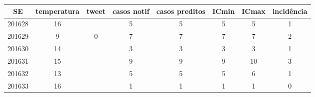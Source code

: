 \begin{tabular}{c|ccccccc}
  \hline
SE & temperatura & tweet & casos notif & casos preditos & ICmin & ICmax & incidência \\ 
  \hline
201628 & 16 &  & 5 & 5 & 5 & 5 & 1 \\ 
  201629 & 9 & 0 & 7 & 7 & 7 & 7 & 2 \\ 
  201630 & 14 &  & 3 & 3 & 3 & 3 & 1 \\ 
  201631 & 15 &  & 9 & 9 & 9 & 10 & 3 \\ 
  201632 & 13 &  & 5 & 5 & 5 & 6 & 1 \\ 
  201633 & 16 &  & 1 & 1 & 1 & 1 & 0 \\ 
   \hline
\end{tabular}
